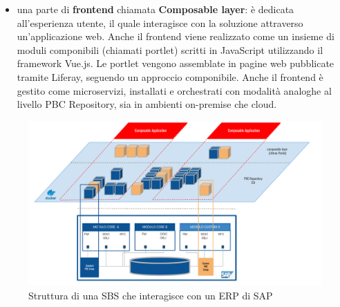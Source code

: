 \begin{itemize}
\begin{itemize}
            prezzi dei materiali PBC 0217 MATPRICELIST e l’unità di misura dei materiali PBC 0222 UNITOFMEASURE.
            In uno scenario on-premise (installazione presso il data-center del cliente), i
            microservizi sono orchestrati tramite Docker Compose. In uno scenario on-cloud, i
            microservizi vengono gestiti tramite Kubernetes\footnote{\url{https://kubernetes.io}}.
        \end{itemize}
    \item una parte di \textbf{frontend} chiamata \textbf{Composable layer}: è dedicata all’esperienza utente, il quale interagisce con
    la soluzione attraverso un'applicazione web.
    Anche il frontend viene realizzato come un insieme di moduli componibili (chiamati portlet)
    scritti in JavaScript utilizzando il framework Vue.js. Le portlet vengono assemblate in pagine web
    pubblicate tramite Liferay, seguendo un approccio componibile. Anche il frontend è gestito come
    microservizi, installati e orchestrati con modalità analoghe al livello \ac{PBC} Repository, sia in
    ambienti on-premise che cloud.
\end{itemize}

\begin{figure}
    \centering
    \includegraphics[width=\linewidth]{figures/architetturaSBS_SAP.pdf}
    \caption{Struttura di una \ac{SBS} che interagisce con un \ac{ERP} di SAP}
    \label{fig:sbs-sap}
\end{figure}

